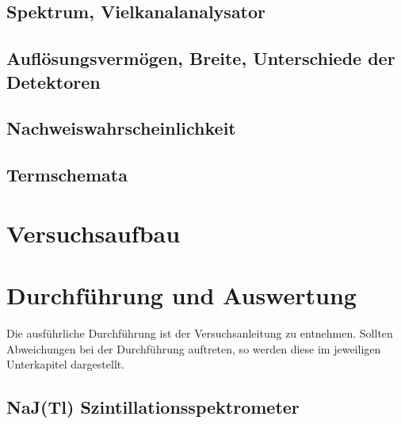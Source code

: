 \documentclass[11pt, a4paper]{article}
\numberwithin{equation}{section}
\begin{document}
\subsection{Spektrum, Vielkanalanalysator}

\subsection{Auflösungsvermögen, Breite, Unterschiede der Detektoren}

\subsection{Nachweiswahrscheinlichkeit}

\subsection{Termschemata}


\section{Versuchsaufbau}

\section{Durchführung und Auswertung}
Die ausführliche Durchführung ist der Versuchsanleitung \cite{anleitung} zu entnehmen.
Sollten Abweichungen bei der Durchführung auftreten, so werden diese im jeweiligen Unterkapitel dargestellt.

\subsection{NaJ(Tl) Szintillationsspektrometer}
\end{document}
